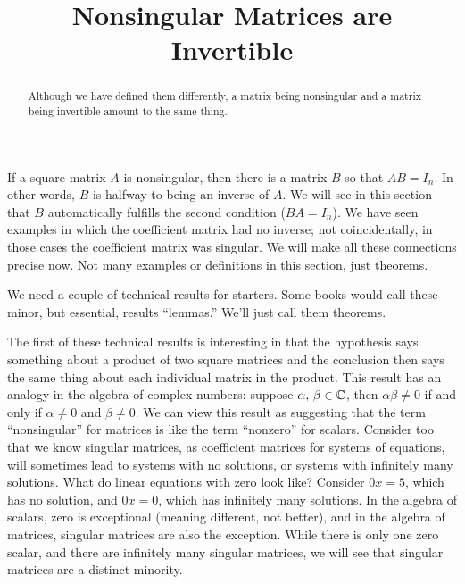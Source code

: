 \documentclass{ximera}
\title{Nonsingular Matrices are Invertible}
\begin{document}
\begin{abstract}
  Although we have defined them differently, a matrix being
  nonsingular and a matrix being invertible amount to the same thing.
\end{abstract}
\maketitle

If a square matrix $A$ is nonsingular, then there is a matrix $B$ so
that $AB=I_n$.  In other words, $B$ is halfway to being an inverse of
$A$.  We will see in this section that $B$ automatically fulfills the
second condition ($BA=I_n$).  We have seen examples in which the
coefficient matrix had no inverse; not coincidentally, in those cases
the coefficient matrix was singular.  We will make all these
connections precise now.  Not many examples or definitions in this
section, just theorems.

We need a couple of technical results for starters.  Some books would
call these minor, but essential, results ``lemmas.''  We'll just call
them theorems.

The first of these technical results is interesting in that the
hypothesis says something about a product of two square matrices and
the conclusion then says the same thing about each individual matrix
in the product.  This result has an analogy in the algebra of complex
numbers: suppose $\alpha,\,\beta\in\mathbb{C}$, then
$\alpha\beta\neq 0$ if and only if $\alpha\neq 0$ and $\beta\neq 0$.
We can view this result as suggesting that the term ``nonsingular''
for matrices is like the term ``nonzero'' for scalars.  Consider too
that we know singular matrices, as coefficient matrices for systems of
equations, will sometimes lead to systems with no solutions, or
systems with infinitely many solutions.  What do linear equations with
zero look like?  Consider $0x=5$, which has no solution, and $0x=0$,
which has infinitely many solutions.  In the algebra of scalars, zero
is exceptional (meaning different, not better), and in the algebra of
matrices, singular matrices are also the exception.  While there is
only one zero scalar, and there are infinitely many singular matrices,
we will see that singular matrices are a distinct minority.
\end{document}
